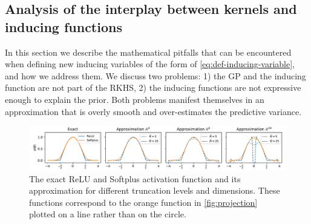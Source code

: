 \subsection{Analysis of the interplay between kernels and inducing functions}
\label{sec:zonal-kernels-and-rkhs}

In this section we describe the mathematical pitfalls that can be encountered \citep[e.g.,][]{sun2021neural} when defining new inducing variables of the form of \cref{eq:def-inducing-variable}, and how we address them. We discuss two problems: 1) the GP and the inducing function are not part of the RKHS, 2) the inducing functions are not expressive enough to explain the prior. Both problems manifest themselves in an approximation that is overly smooth and over-estimates the predictive variance.

\begin{figure}[t]
    \centering
    \includegraphics[width=\linewidth]{truncation_activations_circle}
    \caption{The exact ReLU and Softplus activation function and its approximation for different truncation levels and dimensions. These functions correspond to the orange function in \cref{fig:projection} plotted on a line rather than on the circle.}
    \label{fig:activation-functions}
\end{figure}

